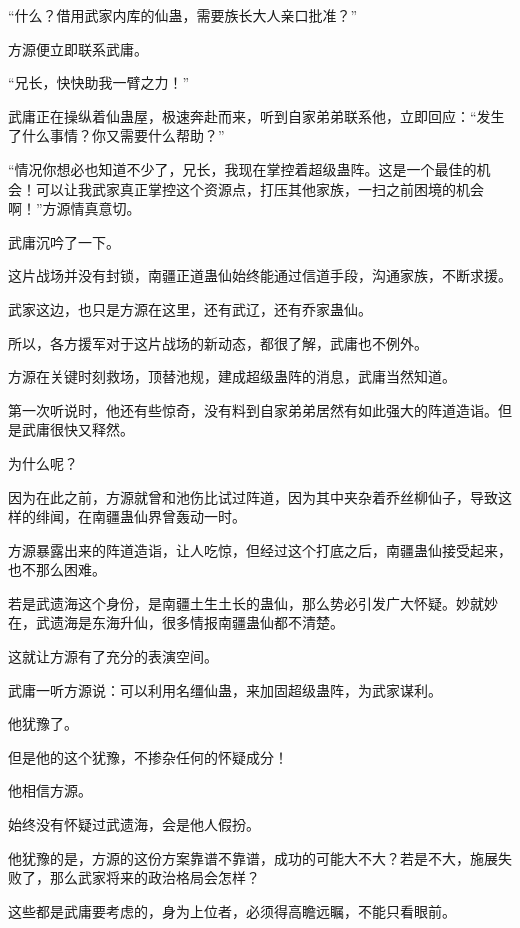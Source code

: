 \begin{this_body}
“什么？借用武家内库的仙蛊，需要族长大人亲口批准？”

方源便立即联系武庸。

“兄长，快快助我一臂之力！”

武庸正在操纵着仙蛊屋，极速奔赴而来，听到自家弟弟联系他，立即回应：“发生了什么事情？你又需要什么帮助？”

“情况你想必也知道不少了，兄长，我现在掌控着超级蛊阵。这是一个最佳的机会！可以让我武家真正掌控这个资源点，打压其他家族，一扫之前困境的机会啊！”方源情真意切。

武庸沉吟了一下。

这片战场并没有封锁，南疆正道蛊仙始终能通过信道手段，沟通家族，不断求援。

武家这边，也只是方源在这里，还有武辽，还有乔家蛊仙。

所以，各方援军对于这片战场的新动态，都很了解，武庸也不例外。

方源在关键时刻救场，顶替池规，建成超级蛊阵的消息，武庸当然知道。

第一次听说时，他还有些惊奇，没有料到自家弟弟居然有如此强大的阵道造诣。但是武庸很快又释然。

为什么呢？

因为在此之前，方源就曾和池伤比试过阵道，因为其中夹杂着乔丝柳仙子，导致这样的绯闻，在南疆蛊仙界曾轰动一时。

方源暴露出来的阵道造诣，让人吃惊，但经过这个打底之后，南疆蛊仙接受起来，也不那么困难。

若是武遗海这个身份，是南疆土生土长的蛊仙，那么势必引发广大怀疑。妙就妙在，武遗海是东海升仙，很多情报南疆蛊仙都不清楚。

这就让方源有了充分的表演空间。

武庸一听方源说：可以利用名缰仙蛊，来加固超级蛊阵，为武家谋利。

他犹豫了。

但是他的这个犹豫，不掺杂任何的怀疑成分！

他相信方源。

始终没有怀疑过武遗海，会是他人假扮。

他犹豫的是，方源的这份方案靠谱不靠谱，成功的可能大不大？若是不大，施展失败了，那么武家将来的政治格局会怎样？

这些都是武庸要考虑的，身为上位者，必须得高瞻远瞩，不能只看眼前。

\end{this_body}


